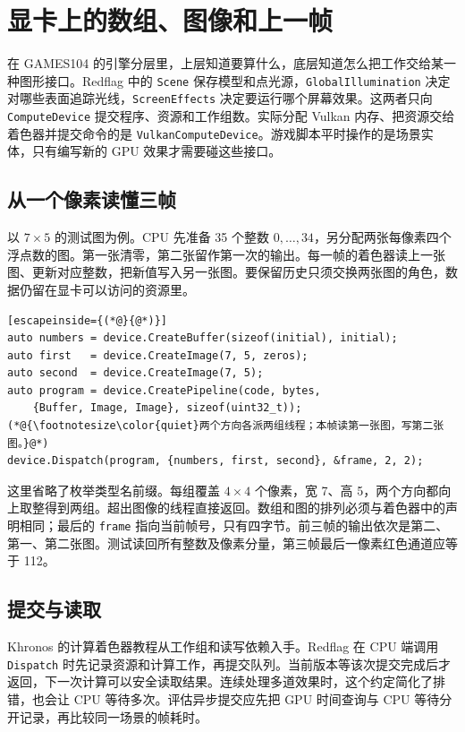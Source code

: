\clearpage
\section{显卡上的数组、图像和上一帧}
在 GAMES104 的引擎分层里，上层知道要算什么，底层知道怎么把工作交给某一种图形接口。Redflag 中的 \texttt{Scene} 保存模型和点光源，\texttt{GlobalIllumination} 决定对哪些表面追踪光线，\texttt{ScreenEffects} 决定要运行哪个屏幕效果。这两者只向 \texttt{ComputeDevice} 提交程序、资源和工作组数。实际分配 Vulkan 内存、把资源交给着色器并提交命令的是 \texttt{VulkanComputeDevice}。游戏脚本平时操作的是场景实体，只有编写新的 GPU 效果才需要碰这些接口。

\subsection{从一个像素读懂三帧}
以 $7\times5$ 的测试图为例。CPU 先准备 35 个整数 $0,\ldots,34$，另分配两张每像素四个浮点数的图。第一张清零，第二张留作第一次的输出。每一帧的着色器读上一张图、更新对应整数，把新值写入另一张图。要保留历史只须交换两张图的角色，数据仍留在显卡可以访问的资源里。

\par\nopagebreak
\begin{lstlisting}[escapeinside={(*@}{@*)}]
auto numbers = device.CreateBuffer(sizeof(initial), initial);
auto first   = device.CreateImage(7, 5, zeros);
auto second  = device.CreateImage(7, 5);
auto program = device.CreatePipeline(code, bytes,
    {Buffer, Image, Image}, sizeof(uint32_t));
(*@{\footnotesize\color{quiet}两个方向各派两组线程；本帧读第一张图，写第二张图。}@*)
device.Dispatch(program, {numbers, first, second}, &frame, 2, 2);
\end{lstlisting}
这里省略了枚举类型名前缀。每组覆盖 $4\times4$ 个像素，宽 7、高 5，两个方向都向上取整得到两组。超出图像的线程直接返回。数组和图的排列必须与着色器中的声明相同；最后的 \texttt{frame} 指向当前帧号，只有四字节。前三帧的输出依次是第二、第一、第二张图。测试读回所有整数及像素分量，第三帧最后一像素红色通道应等于 112。

\subsection{提交与读取}
Khronos 的计算着色器教程从工作组和读写依赖入手。Redflag 在 CPU 端调用 \texttt{Dispatch} 时先记录资源和计算工作，再提交队列。当前版本等该次提交完成后才返回，下一次计算可以安全读取结果。连续处理多道效果时，这个约定简化了排错，也会让 CPU 等待多次。评估异步提交应先把 GPU 时间查询与 CPU 等待分开记录，再比较同一场景的帧耗时。

